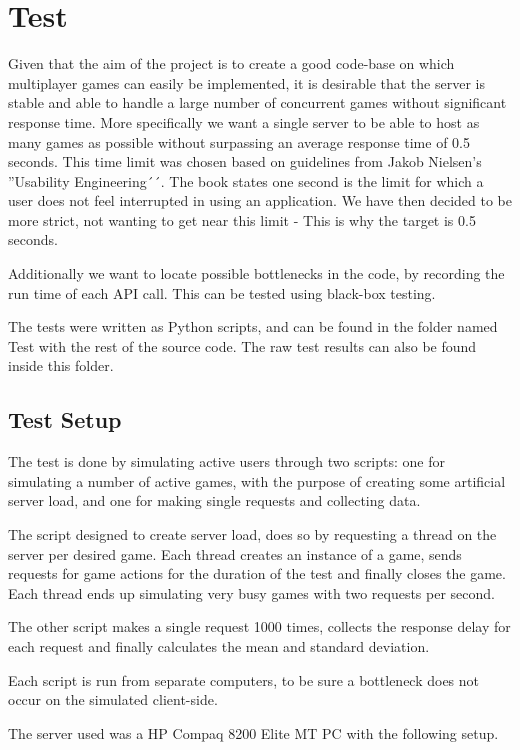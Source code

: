\section{Test} \label{sec:test}
Given that the aim of the project is to create a good code-base on which multiplayer games can easily be implemented, it is desirable that the server is stable and able to handle a large number of concurrent games without significant response time. More specifically we want a single server to be able to host as many games as possible without surpassing an average response time of 0.5 seconds. This time limit was chosen based on guidelines from Jakob Nielsen's ''Usability Engineering´´.\cite{response-time} The book states one second is the limit for which a user does not feel interrupted in using an application. We have then decided to be more strict, not wanting to get near this limit - This is why the target is 0.5 seconds.

Additionally we want to locate possible bottlenecks in the code, by recording the run time of each API call. This can be tested using black-box testing.

The tests were written as Python scripts, and can be found in the folder named Test with the rest of the source code. The raw test results can also be found inside this folder.

\subsection{Test Setup} \label{sec:testSetup}
The test is done by simulating active users through two scripts: one for simulating a number of active games, with the purpose of creating some artificial server load, and one for making single requests and collecting data.

The script designed to create server load, does so by requesting a thread on the server per desired game. Each thread creates an instance of a game, sends requests for game actions for the duration of the test and finally closes the game. Each thread ends up simulating very busy games with two requests per second.

The other script makes a single request 1000 times, collects the response delay for each request and finally calculates the mean and standard deviation.

Each script is run from separate computers, to be sure a bottleneck does not occur on the simulated client-side.

The server used was a HP Compaq 8200 Elite MT PC with the following setup.

